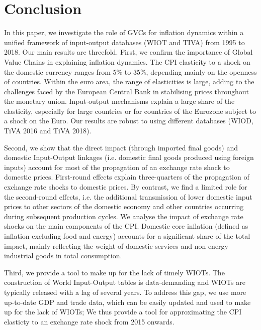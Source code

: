 \documentclass[11pt,a4paper]{article}
\begin{document}
\section{Conclusion}
\label{sec:ccl}
In this paper, we investigate the role of GVCs for inflation dynamics within a unified framework of input-output databases (WIOT and TIVA) from 1995 to 2018.  
Our main results are threefold.
First, we confirm the importance of Global Value Chains in explaining inflation dynamics.
The CPI elasticity to a shock on the domestic currency ranges from 5\% to 35\%, depending mainly on the openness of countries.
Within the euro area, the range of elasticities is large, adding to the challenges faced by the European Central Bank in stabilising prices throughout the monetary union.
Input-output mechanisms explain a large share of the elasticity, especially for large countries or for countries of the Eurozone subject to a shock on the Euro.
Our results are robust to using different databases (WIOD, TiVA 2016 and TiVA 2018).

Second, we show that the direct impact (through imported final goods) and domestic Input-Output linkages (i.e. domestic final goods produced using foreign inputs) account for most of the propagation of an exchange rate shock to domestic prices.
First-round effects explain three-quarters of the propagation of exchange rate shocks to domestic prices.
By contrast, we find a limited role for the second-round effects, i.e. the additional transmission of lower domestic input prices to other sectors of the domestic economy and other countries occurring during subsequent production cycles.
We analyse the impact of exchange rate shocks on the main components of the CPI. Domestic core inflation (defined as inflation excluding food and energy) accounts for a significant share of the total impact, mainly reflecting the weight of domestic services and non-energy industrial goods in total consumption.


Third, we provide a tool to make up for the lack of timely WIOTs. 
The construction of World Input-Output tables is data-demanding and WIOTs are typically released with a lag of several years. 
To address this gap, we use more up-to-date GDP and trade data, which can be easily updated and used to make up for the lack of WIOTs;
We thus provide a tool for approximating the CPI elasticty to an exchange rate shock from 2015 onwards.
\end{document}
